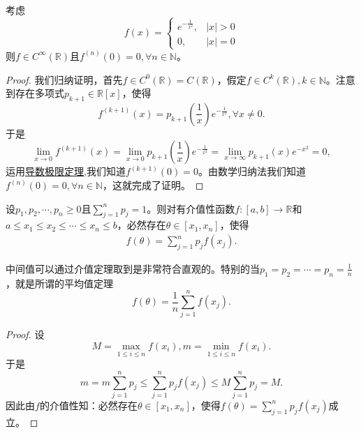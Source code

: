 \documentclass[../../main.tex]{subfiles}
\begin{document}
\begin{example}[\,\,经典光滑函数]\label{example:经典光滑函数}
考虑
\[
f(x)=
\begin{cases}
e^{-\frac{1}{x^2}}, &|x|>0 \\
0, &|x| = 0
\end{cases}
\]
则\(f\in C^{\infty}(\mathbb{R})\)且\(f^{(n)}(0)=0,\forall n\in\mathbb{N}\)。
\end{example}
\begin{proof}
我们归纳证明，首先\(f\in C^{0}(\mathbb{R}) = C(\mathbb{R})\)，假定\(f\in C^{k}(\mathbb{R}),k\in\mathbb{N}\)。注意到存在多项式\(p_{k + 1}\in\mathbb{R}[x]\)，使得
\[
f^{(k + 1)}(x)=p_{k + 1}\left(\frac{1}{x}\right)e^{-\frac{1}{x^2}},\forall x\neq0.
\]
于是
\[
\lim_{x\rightarrow0}f^{(k + 1)}(x)=\lim_{x\rightarrow0}p_{k + 1}\left(\frac{1}{x}\right)e^{-\frac{1}{x^2}}=\lim_{x\rightarrow\infty}p_{k + 1}(x)e^{-x^2}=0,
\]
运用\hyperref[theorem:单侧导数极限定理]{导数极限定理},我们知道\(f^{(k + 1)}(0)=0\)。由数学归纳法我们知道\(f^{(n)}(0)=0,\forall n\in\mathbb{N}\)，这就完成了证明。

\end{proof}

\begin{theorem}[连续函数中间值定理]\label{theorem:连续函数中间值定理}
设\(p_1,p_2,\cdots,p_n\geqslant0\)且\(\sum_{j = 1}^{n}p_j = 1\)。则对有介值性函数\(f:[a,b]\to\mathbb{R}\)和\(a\leqslant x_1\leqslant x_2\leqslant\cdots\leqslant x_n\leqslant b\)，必然存在\(\theta\in[x_1,x_n]\)，使得
\begin{align*}
f(\theta)=\sum_{j = 1}^{n}p_jf(x_j).
\end{align*}
\end{theorem}
\begin{note}
中间值可以通过介值定理取到是非常符合直观的。特别的当\(p_1 = p_2=\cdots=p_n=\frac{1}{n}\)，就是所谓的平均值定理
\[
f(\theta)=\frac{1}{n}\sum_{j = 1}^{n}f(x_j).
\]
\end{note}
\begin{proof}
设
\[
M=\max_{1\leqslant i\leqslant n}f(x_i),m=\min_{1\leqslant i\leqslant n}f(x_i).
\]
于是
\[
m = m\sum_{j = 1}^{n}p_j\leqslant\sum_{j = 1}^{n}p_jf(x_j)\leqslant M\sum_{j = 1}^{n}p_j = M.
\]
因此由\(f\)的介值性知：必然存在\(\theta\in[x_1,x_n]\)，使得$f(\theta)=\sum_{j = 1}^{n}p_jf(x_j)$成立。

\end{proof}
\end{document}
